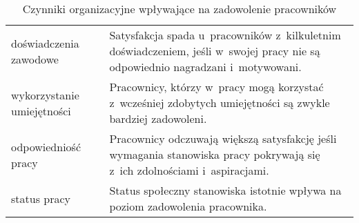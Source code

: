 \noindent\begin{minipage}{\textwidth}
             \begin{table}[H]
                 \raggedright\caption{Czynniki organizacyjne wpływające na zadowolenie pracowników\label{tabela:zadowolenie-pracownikow-organizacja}}
                 \begin{center}
                     \begin{tabular}{|P{.2\textwidth}|P{.7\textwidth}|}

                         \hline
                          &
                          \\
                         \hline

                         doświadczenia zawodowe &
                         Satysfakcja spada u~pracowników z~kilkuletnim doświadczeniem, jeśli w~swojej pracy nie są odpowiednio nagradzani i~motywowani. \\
                         \hline

                         wykorzystanie umiejętności &
                         Pracownicy, którzy w~pracy mogą korzystać z~wcześniej zdobytych umiejętności są zwykle bardziej zadowoleni. \\
                         \hline

                         odpowiedniość pracy &
                         Pracownicy odczuwają większą satysfakcję jeśli wymagania stanowiska pracy pokrywają się z~ich zdolnościami i~aspiracjami. \\
                         \hline

                         status pracy &
                         Status społeczny stanowiska istotnie wpływa na poziom zadowolenia pracownika. \\
                         \hline
                     \end{tabular}
                 \end{center}
                 \raggedright{}
                 \vspace{0.75cm}
             \end{table}
\end{minipage}

